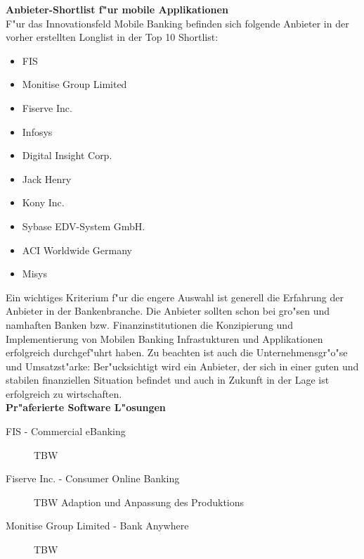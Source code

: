 \textbf{Anbieter-Shortlist f"ur mobile Applikationen}\\
F"ur das Innovationsfeld Mobile Banking befinden sich folgende Anbieter in der vorher erstellten Longlist in der Top 10 Shortlist:

\begin{itemize}
	\item FIS
	\item Monitise Group Limited
	\item Fiserve Inc.
	\item Infosys
	\item Digital Insight Corp.
	\item Jack Henry
	\item Kony Inc.
	\item Sybase EDV-System GmbH.
	\item ACI Worldwide Germany
	\item Misys
\end{itemize}

Ein wichtiges Kriterium f"ur die engere Auswahl ist generell die Erfahrung der Anbieter in der Bankenbranche. Die Anbieter sollten schon bei gro"sen und namhaften Banken bzw. Finanzinstitutionen die Konzipierung und Implementierung von Mobilen Banking Infrastukturen und Applikationen erfolgreich durchgef"uhrt haben. Zu beachten ist auch die Unternehmensgr"o"se und Umsatzst"arke: Ber"ucksichtigt wird ein Anbieter, der sich in einer guten und stabilen finanziellen Situation befindet und auch in Zukunft in der Lage ist erfolgreich zu wirtschaften.\\

\textbf{Pr"aferierte Software L"osungen}
\begin{description}

	\item[FIS - Commercial eBanking]   TBW
	
	\item[Fiserve Inc. - Consumer Online Banking]   TBW Adaption und Anpassung des Produktions 
	
	\item[Monitise Group Limited - Bank Anywhere]   TBW
	
\end{description}